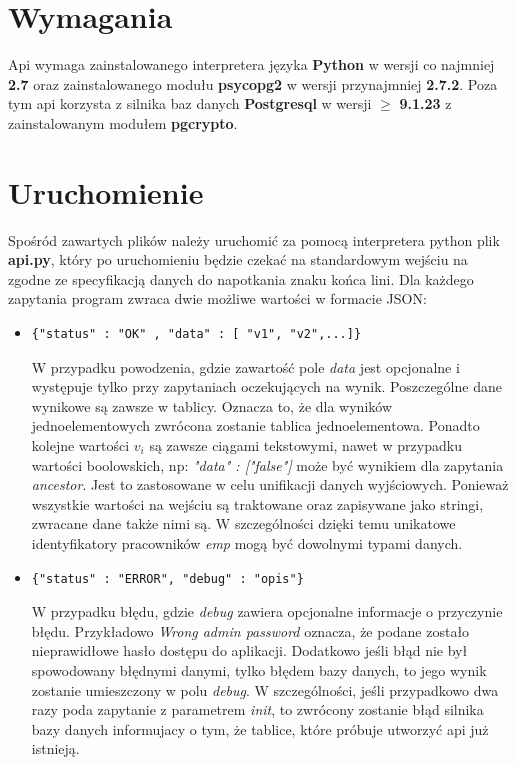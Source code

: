 \documentclass[11pt, wide]{article}
\begin{document}
    \section{Wymagania}
    Api wymaga zainstalowanego interpretera języka \textbf{Python} w wersji co najmniej
    \textbf{2.7} oraz zainstalowanego modułu \textbf{psycopg2} w wersji przynajmniej \textbf{2.7.2}.
    Poza tym api korzysta z silnika baz danych \textbf{Postgresql} w wersji $\geq$ \textbf{9.1.23}
    z zainstalowanym modułem \textbf{pgcrypto}. 

    \section{Uruchomienie}
    Spośród zawartych plików należy uruchomić za pomocą interpretera python plik \textbf{api.py}, który 
    po uruchomieniu będzie czekać na standardowym wejściu na zgodne ze specyfikacją danych 
    do napotkania znaku końca lini. Dla każdego zapytania program zwraca dwie możliwe wartości w formacie JSON:

    \begin{itemize}
    \item  \begin{lstlisting}[style=CStyle] 
        {"status" : "OK" , "data" : [ "v1", "v2",...]}\end{lstlisting}
        W przypadku powodzenia,  gdzie zawartość pole \textit{data} jest opcjonalne i występuje tylko przy zapytaniach
        oczekujących na wynik. Poszczególne dane wynikowe są zawsze w tablicy. Oznacza to, że dla wyników
        jednoelementowych zwrócona zostanie tablica jednoelementowa. Ponadto kolejne wartości 
        \textit{$v_i$} są zawsze ciągami tekstowymi, nawet w przypadku wartości boolowskich, np: 
        \textit{"data" : ["false"]} może być wynikiem dla zapytania \textit{ancestor}. Jest to 
        zastosowane w celu unifikacji danych wyjściowych. Ponieważ wszystkie wartości na wejściu 
        są traktowane oraz zapisywane jako stringi, zwracane dane także nimi są. W szczególności dzięki temu
        unikatowe identyfikatory pracowników \textit{emp} mogą być dowolnymi typami danych.
    \item \begin{lstlisting}[style=CStyle]
        {"status" : "ERROR", "debug" : "opis"}\end{lstlisting}
        W przypadku błędu, gdzie \textit{debug} zawiera opcjonalne informacje o przyczynie błędu.
        Przykładowo \textit{Wrong admin password} oznacza, że podane zostało nieprawidłowe hasło 
        dostępu do aplikacji.  Dodatkowo jeśli błąd nie był spowodowany błędnymi danymi, tylko błędem bazy danych,
        to jego wynik zostanie umieszczony w polu \textit{debug}. W szczególności, jeśli  przypadkowo dwa razy
        poda zapytanie z parametrem \textit{init}, to zwrócony zostanie błąd silnika bazy danych informujacy o tym, że 
        tablice, które próbuje utworzyć api już istnieją. 
    \end{itemize}
\end{document}
